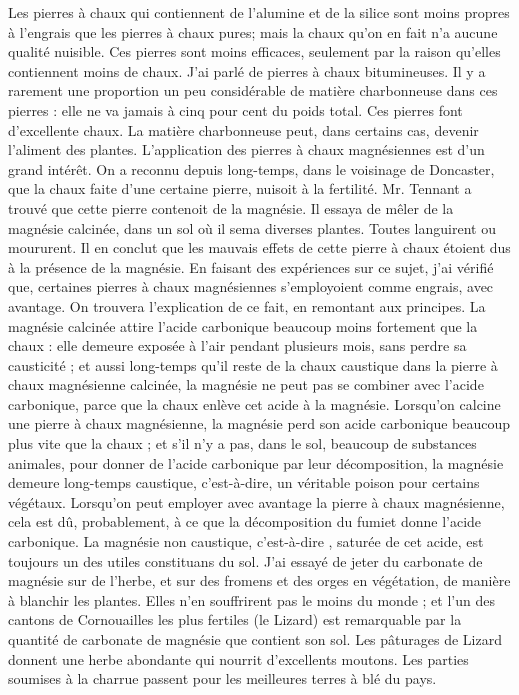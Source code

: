 Les pierres à chaux qui contiennent de l'alumine et de la silice sont moins propres à l'engrais que les pierres à chaux pures;\setcounter{page}{224} mais la chaux qu'on en fait n'a aucune qualité nuisible. Ces pierres sont moins efficaces, seulement par la raison qu'elles contiennent moins de chaux.
J'ai parlé de pierres à chaux bitumineuses. Il y a rarement une proportion un peu considérable de matière charbonneuse dans ces pierres : elle ne va jamais à cinq pour cent du poids total. Ces pierres font d'excellente chaux. La matière charbonneuse peut, dans certains cas, devenir l'aliment des plantes.
L'application des pierres à chaux magnésiennes est d'un grand intérêt. On a reconnu depuis long-temps, dans le voisinage de Doncaster, que la chaux faite d'une certaine pierre, nuisoit à la fertilité. Mr. Tennant a trouvé que cette pierre contenoit de la magnésie. Il essaya de mêler de la magnésie calcinée, dans un sol où il sema diverses plantes. Toutes languirent ou moururent. Il en conclut que les mauvais effets de cette pierre à chaux étoient dus à la présence de la magnésie.
En faisant des expériences sur ce sujet, j'ai vérifié que, certaines pierres à chaux magnésiennes s'employoient comme engrais, avec avantage. On trouvera l'explication de ce fait, en remontant aux principes.
\setcounter{page}{225} La magnésie calcinée attire l'acide carbonique beaucoup moins fortement que la chaux : elle demeure exposée à l'air pendant plusieurs mois, sans perdre sa causticité ; et aussi long-temps qu'il reste de la chaux caustique dans la pierre à chaux magnésienne calcinée, la magnésie ne peut pas se combiner avec l'acide carbonique, parce que la chaux enlève cet acide à la magnésie.
Lorsqu'on calcine une pierre à chaux magnésienne, la magnésie perd son acide carbonique beaucoup plus vite que la chaux ; et s'il n'y a pas, dans le sol, beaucoup de substances animales, pour donner de l'acide carbonique par leur décomposition, la magnésie demeure long-temps caustique, c'est-à-dire, un véritable poison pour certains végétaux. Lorsqu'on peut employer avec avantage la pierre à chaux magnésienne, cela est dû, probablement, à ce que la décomposition du fumiet donne l'acide carbonique.
La magnésie non caustique, c'est-à-dire , saturée de cet acide, est toujours un des utiles constituans du sol. J'ai essayé de jeter du carbonate de magnésie sur de l'herbe, et sur des fromens et des orges en végétation, de manière à blanchir les plantes. Elles n'en souffrirent pas le moins du monde ; et l'un\setcounter{page}{226} des cantons de Cornouailles les plus fertiles (le Lizard) est remarquable par la quantité de carbonate de magnésie que contient son sol. Les pâturages de Lizard donnent une herbe abondante qui nourrit d'excellents moutons. Les parties soumises à la charrue passent pour les meilleures terres à blé du pays.
